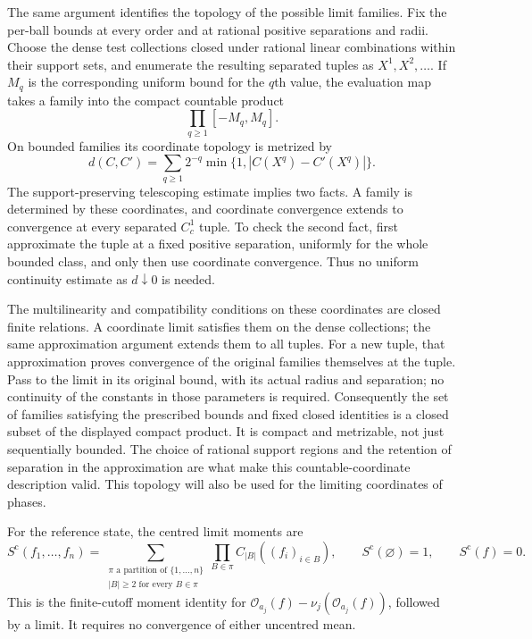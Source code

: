 \documentclass[11pt,letterpaper,reqno]{amsart}
\theoremstyle{definition}
\theoremstyle{remark}
\newcommand{\cO}{\mathcal O}
\begin{document}
The same argument identifies the topology of the possible limit
families. Fix the per-ball bounds at every order and at rational
positive separations and radii. Choose the dense test collections
closed under rational linear combinations within their support sets,
and enumerate the resulting separated tuples as $X^1,X^2,\ldots$.
If $M_q$ is the corresponding uniform bound for the $q$th value, the
evaluation map takes a family into the compact countable product
\[
 \prod_{q\ge1}[-M_q,M_q].
\]
On bounded families its coordinate topology is metrized by
\[
 d(C,C')=\sum_{q\ge1}2^{-q}
                      \min\{1,|C(X^q)-C'(X^q)|\}.
\]
The support-preserving telescoping estimate implies two facts. A
family is determined by these coordinates, and coordinate convergence
extends to convergence at every separated $C_c^1$ tuple. To check
the second fact, first approximate the tuple at a fixed positive
separation, uniformly for the whole bounded class, and only then use
coordinate convergence. Thus no uniform continuity estimate as
$d\downarrow0$ is needed.

The multilinearity and compatibility conditions on these coordinates
are closed finite relations. A coordinate limit satisfies them on the
dense collections; the same approximation argument extends them to
all tuples. For a new tuple, that approximation proves convergence of
the original families themselves at the tuple. Pass to the limit in
its original bound, with its actual radius and separation; no
continuity of the constants in those parameters is required.
Consequently the set of families satisfying
the prescribed bounds and fixed closed identities is a closed subset
of the displayed compact product. It is compact and metrizable, not
just sequentially bounded. The choice of rational support regions
and the retention of separation in the approximation are what make
this countable-coordinate description valid. This topology will also
be used for the limiting coordinates of phases.

For the reference state, the centred limit moments are
\begin{equation}\label{eq:centred-moments}
 S^{\mathrm c}(f_1,\ldots,f_n)
   =\sum_{\substack{\pi\text{ a partition of }\{1,\ldots,n\}\\
                         |B|\ge2\text{ for every }B\in\pi}}
                       \prod_{B\in\pi}C_{|B|}((f_i)_{i\in B}),
 \qquad S^{\mathrm c}(\varnothing)=1,
 \qquad S^{\mathrm c}(f)=0.
\end{equation}
This is the finite-cutoff moment identity for
$\cO_{a_j}(f)-\nu_j(\cO_{a_j}(f))$, followed by a limit. It requires
no convergence of either uncentred mean.
\end{document}
